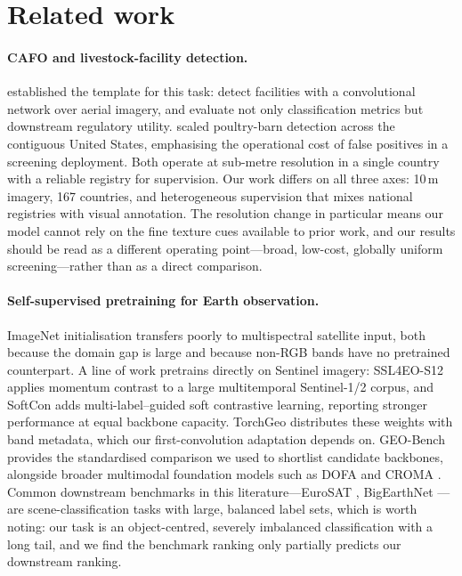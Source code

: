\documentclass[11pt,a4paper]{article}
\begin{document}
\section{Related work}

\paragraph{CAFO and livestock-facility detection.}
\citet{handannader2019cafo} established the template for this task: detect
facilities with a convolutional network over aerial imagery, and evaluate not
only classification metrics but downstream regulatory utility.
\citet{robinson2022poultry} scaled poultry-barn detection across the
contiguous United States, emphasising the operational cost of false positives
in a screening deployment. Both operate at sub-metre resolution in a single
country with a reliable registry for supervision. Our work differs on all three
axes: 10\,m imagery, 167 countries, and heterogeneous supervision that mixes
national registries with visual annotation. The resolution change in particular
means our model cannot rely on the fine texture cues available to prior work,
and our results should be read as a different operating point---broad,
low-cost, globally uniform screening---rather than as a direct comparison.

\paragraph{Self-supervised pretraining for Earth observation.}
ImageNet initialisation transfers poorly to multispectral satellite input,
both because the domain gap is large and because non-RGB bands have no
pretrained counterpart. A line of work pretrains directly on Sentinel imagery:
SSL4EO-S12 \citep{wang2023ssl4eo} applies momentum contrast
\citep{he2020moco} to a large multitemporal Sentinel-1/2 corpus, and SoftCon
\citep{wang2024softcon} adds multi-label--guided soft contrastive learning,
reporting stronger performance at equal backbone capacity. TorchGeo
\citep{stewart2022torchgeo} distributes these weights with band metadata, which
our first-convolution adaptation depends on. GEO-Bench
\citep{lacoste2023geobench} provides the standardised comparison we used to
shortlist candidate backbones, alongside broader multimodal foundation models
such as DOFA \citep{xiong2024dofa} and CROMA \citep{fuller2023croma}. Common
downstream benchmarks in this literature---EuroSAT \citep{helber2019eurosat},
BigEarthNet \citep{sumbul2019bigearthnet}---are scene-classification tasks with
large, balanced label sets, which is worth noting: our task is an object-centred,
severely imbalanced classification with a long tail, and we find the benchmark
ranking only partially predicts our downstream ranking.
\end{document}

